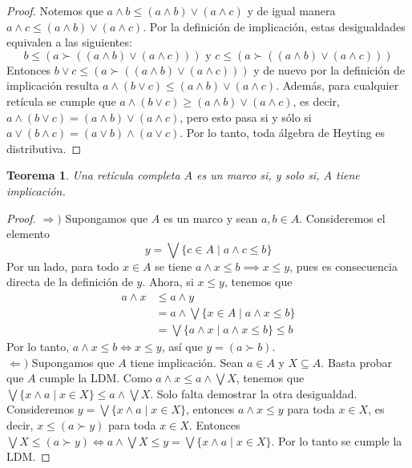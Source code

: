 \documentclass[12pt,letterpaper,titlepage]{article}
\newtheorem{thm}{Teorema}
\theoremstyle{definition}
\newcommand\Sup{\bigvee}
\renewcommand\inf{\wedge}
\newcommand\<{\langle}
\renewcommand\>{\rangle}
\begin{document}
\begin{proof}
    Notemos que $a\wedge b \leq (a\wedge b)\vee (a\wedge c)$ y de igual manera $a\wedge c\leq  (a\wedge b)\vee (a\wedge c)$. Por la definición de implicación, estas desigualdades equivalen a las siguientes:
    $$b\leq (a \succ ((a \wedge b) \vee (a \wedge c))) \mbox{ y } c \leq (a\succ ((a \wedge b) \vee (a \wedge c)))$$
    Entonces $b \vee c \leq (a \succ ((a \wedge b) \vee (a \wedge c)))$ y de nuevo por la definición de implicación resulta $a \wedge (b \vee c)\leq (a\wedge b)\vee (a \wedge c)$. Además, para cualquier retícula se cumple que $a \wedge (b \vee c)\geq (a\wedge b)\vee (a \wedge c)$, es decir, $a \wedge (b \vee c)= (a\wedge b)\vee (a \wedge c)$, pero esto pasa si y sólo si $a \vee (b \wedge c)= (a\vee b)\wedge (a \vee c)$. Por lo tanto, toda álgebra de Heyting es distributiva.
\end{proof}

\begin{thm}
  Una retícula completa $A$ es un marco si, y solo si, $A$ tiene
  implicación.
\end{thm}
\begin{proof}
    $\Rightarrow )$ Supongamos que $A$ es un marco y sean $a,b\in A$.
    Consideremos el elemento
    $$y=\Sup\{c\in A\mid a\wedge c\leq b\}$$
    Por un lado, para todo $x\in A$ se tiene
    $a\wedge x\leq b\implies x\leq y$,
    pues es consecuencia directa de la definición de $y$.
    Ahora, si $x\leq y$, tenemos que 
    \begin{align*}
        a\inf x
        & \leq a\inf y \\
        & = a\inf\Sup\{x\in A\mid a\inf x\leq b\}\\
        & = \Sup \{a\inf x \mid a\inf x\leq b\}\leq b
    \end{align*}
    Por lo tanto, $a\wedge x\leq b\Leftrightarrow x\leq y$,
    así que $y=(a\succ b)$. \\
    $\Leftarrow )$ Supongamos que $A$ tiene implicación.
    Sean $a\in A$ y $X\subseteq A$.
    Basta probar que $A$ cumple la LDM.
    Como $a\inf x\leq a\inf\Sup X$, tenemos que
    $\Sup\{x\inf a\mid x\in X\}\leq a\inf\Sup X$.
    Solo falta demostrar la otra desigualdad. Consideremos $y=\bigvee\{x\wedge a\mid x\in X\}$, entonces $a\wedge x\leq y$ para toda $x\in X$, es decir, $x\leq (a\succ y)$ para toda $x\in X$. Entonces $\bigvee X\leq (a\succ y)\Leftrightarrow a\wedge\bigvee X\leq y=\bigvee \{x\wedge a\mid x\in X\}$. Por lo tanto se cumple la LDM.
\end{proof}
\end{document}
